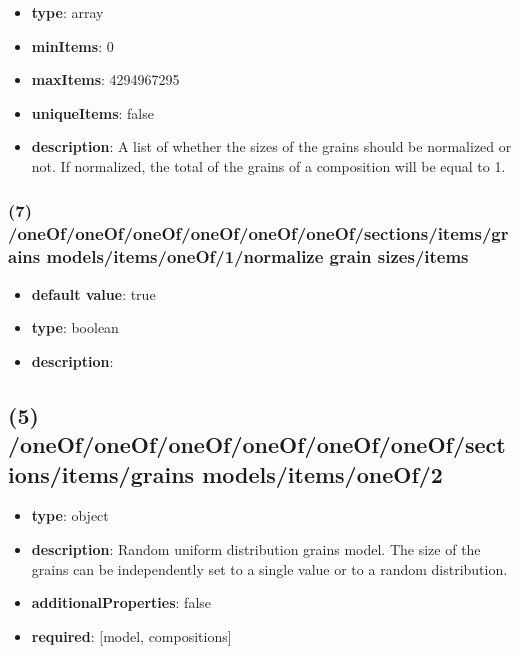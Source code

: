 \begin{itemize}[leftmargin=6em]\item {\bf type}: array
\item {\bf minItems}: 0
\item {\bf maxItems}: 4294967295
\item {\bf uniqueItems}: false
\item {\bf description}: A list of whether the sizes of the grains should be normalized or not. If normalized, the total of the grains of a composition will be equal to 1.
\end{itemize}\subsubsection{(7) /oneOf/oneOf/oneOf/oneOf/oneOf/oneOf/sections/items/grains models/items/oneOf/1/normalize grain sizes/items}
\begin{itemize}[leftmargin=7em]\item {\bf default value}: true
\item {\bf type}: boolean
\item {\bf description}: 
\end{itemize}\subsection{(5) /oneOf/oneOf/oneOf/oneOf/oneOf/oneOf/sections/items/grains models/items/oneOf/2}
\begin{itemize}[leftmargin=5em]\item {\bf type}: object
\item {\bf description}: Random uniform distribution grains model. The size of the grains can be independently set to a single value or to a random distribution.
\item {\bf additionalProperties}: false
\item {\bf required}: [model, compositions]\end{itemize}
